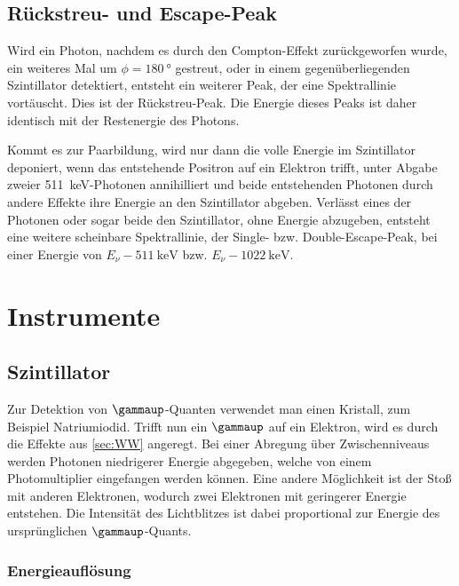 \documentclass[11pt, ngerman, fleqn, DIV=15, headinclude, BCOR=2cm]{scrreprt}
\begin{document}
\subsection{Rückstreu- und Escape-Peak}

Wird ein Photon, nachdem es durch den Compton-Effekt zurückgeworfen wurde, ein
weiteres Mal um $\phi = \SI{180}{\degree}$ gestreut, oder in einem
gegenüberliegenden Szintillator detektiert, entsteht ein weiterer Peak, der
eine Spektrallinie vortäuscht. Dies ist der Rückstreu-Peak. Die Energie dieses
Peaks ist daher identisch mit der Restenergie des Photons.

Kommt es zur Paarbildung, wird nur dann die volle Energie im Szintillator
deponiert, wenn das entstehende Positron auf ein Elektron trifft, unter Abgabe
zweier \SI{511}{\kilo\electronvolt}-Photonen annihilliert und beide
entstehenden Photonen durch andere Effekte ihre Energie an den Szintillator
abgeben. Verlässt eines der Photonen oder sogar beide den Szintillator, ohne
Energie abzugeben, entsteht eine weitere scheinbare Spektrallinie, der Single-
bzw. Double-Escape-Peak, bei einer Energie von
$E_\nu-\SI{511}{\kilo\electronvolt}$ bzw. $E_\nu-\SI{1022}{\kilo\electronvolt}$.



\section{Instrumente}

\subsection{Szintillator}

Zur Detektion von $\gammaup$-Quanten verwendet man einen Kristall, zum Beispiel
Natriumiodid. Trifft nun ein $\gammaup$ auf ein Elektron, wird es durch die
Effekte aus \ref{sec:WW} angeregt. Bei einer Abregung über Zwischenniveaus
werden Photonen niedrigerer Energie abgegeben, welche von einem
Photomultiplier eingefangen werden können. Eine andere Möglichkeit ist der
Stoß mit anderen Elektronen, wodurch zwei Elektronen mit geringerer Energie
entstehen. Die Intensität des Lichtblitzes ist dabei proportional zur Energie
des ursprünglichen $\gammaup$-Quants.

\subsubsection{Energieauflösung}
\end{document}
